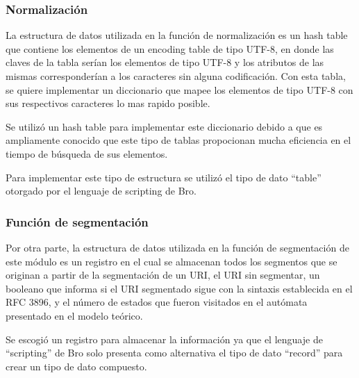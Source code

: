 \subsubsection{Normalización}
\label{sssec:estructuraNormalizacion}

La estructura de datos utilizada en la función de normalización es un hash table que contiene los elementos de un encoding table de tipo UTF-8, en donde las claves de la tabla serían los elementos de tipo UTF-8 y los atributos de las mismas corresponderían a los caracteres sin alguna codificación. Con esta tabla, se quiere implementar un diccionario que mapee los elementos de tipo UTF-8 con sus respectivos caracteres lo mas rapido posible.

Se utilizó un hash table para implementar este diccionario debido a que es ampliamente conocido que este tipo de tablas propocionan mucha eficiencia en el tiempo de búsqueda de sus elementos.

Para implementar este tipo de estructura se utilizó el tipo de dato “table” otorgado por el lenguaje de scripting de Bro.

\subsubsection{Función de segmentación}
\label{sssec:estructuraSegmentacion}

Por otra parte, la estructura de datos utilizada en la función de segmentación de este módulo es un registro en el cual se almacenan todos los segmentos que se originan a partir de la segmentación de un URI, el URI sin segmentar, un booleano que informa si el URI segmentado sigue con la sintaxis establecida en el RFC 3896, y el número de estados que fueron visitados en el autómata presentado en el modelo teórico.
 
Se escogió un registro para almacenar la información ya que el lenguaje de ``scripting'' de Bro solo presenta como alternativa el tipo de dato ``record'' para crear un tipo de dato compuesto. 

